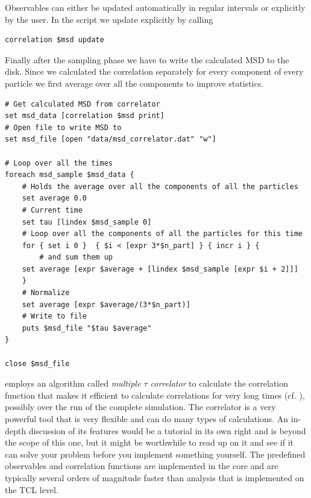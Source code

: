 \documentclass[
paper=a4,                       %
fontsize=11pt,                  %
twoside,                        %
footsepline,                    %
headsepline,                    %
headinclude=false,              %
footinclude=false,              %
pagesize,                       %
]{scrartcl}
\begin{document}
Observables can either be updated automatically in regular intervals or explicitly by the user. In the script we update explicitly by calling

{\small\vspace{0,2cm}
\begin{lstlisting}[numbers=none]
correlation $msd update
\end{lstlisting}\vspace{0,2cm}
} 

Finally after the sampling phase we have to write the calculated MSD to the disk.
Since we calculated the correlation separately for every component of every particle we first
average over all the components to improve statistics.

{\small\vspace{0,2cm}
\begin{lstlisting}[numbers=none]
# Get calculated MSD from correlator
set msd_data [correlation $msd print]
# Open file to write MSD to
set msd_file [open "data/msd_correlator.dat" "w"]

# Loop over all the times
foreach msd_sample $msd_data {
    # Holds the average over all the components of all the particles
    set average 0.0
    # Current time
    set tau [lindex $msd_sample 0]
    # Loop over all the components of all the particles for this time
    for { set i 0 }  { $i < [expr 3*$n_part] } { incr i } {
        # and sum them up
	set average [expr $average + [lindex $msd_sample [expr $i + 2]]]
    }
    # Normalize
    set average [expr $average/(3*$n_part)]
    # Write to file
    puts $msd_file "$tau $average"
}

close $msd_file
\end{lstlisting}\vspace{0,2cm}
} 


\es{} employs an algorithm called \emph{multiple $\tau$ correlator} to calculate the correlation function
that makes it efficient to calculate correlations for very long times (cf. \cite{frenkel02b}), possibly over the run of the complete
simulation. The correlator is a very powerful tool that is very flexible and can do many types of calculations.
An in-depth discussion of its features would be a tutorial in its own right and is beyond the scope of this
one, but it might be worthwhile to read up on it and see if it can solve your problem before you implement
something yourself. The predefined observables and correlation functions are implemented in the \es{} core and
are typically several orders of magnitude faster than analysis that is implemented on the TCL level.
\end{document}
